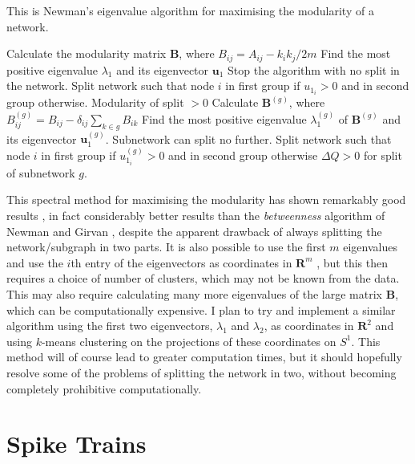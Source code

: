 \documentclass[a4paper,12pt]{report}
\begin{document}
\begin{algorithm}
\caption{This is Newman's eigenvalue algorithm for maximising the modularity of a network.}
\label{algo-split}
\begin{algorithmic}
\STATE Calculate the modularity matrix $\mathbf{B}$, where $B_{ij} = A_{ij} - k_ik_j/2m$
\STATE Find the most positive eigenvalue $\lambda_1$ and its eigenvector $\mathbf{u}_1$
\STATE Stop the algorithm with no split in the network.
\ELSE
\STATE Split network such that node $i$ in first group if $u_{1_{i}} > 0$ and in second group otherwise.
\ENSURE Modularity of split $> 0$
\ENDIF
{}
\STATE Calculate $\mathbf{B}^{(g)}$, where $B^{(g)}_{ij} = B_{ij} - \delta_{ij}\sum_{k\in g}B_{ik}$
\STATE Find the most positive eigenvalue $\lambda^{(g)}_1$ of $\mathbf{B}^{(g)}$ and its eigenvector $\mathbf{u}^{(g)}_1$.
\STATE Subnetwork can split no further.
\ELSE
\STATE Split network such that node $i$ in first group if $u^{(g)}_{1_{i}} > 0$ and in second group otherwise
\ENSURE $\Delta Q > 0$ for split of subnetwork $g$.
\ENDIF
\ENDFOR
\end{algorithmic}
\end{algorithm}



This spectral method for maximising the modularity has shown
remarkably good results \cite{Newman2006a}, in fact considerably better results
than the {\sl betweenness} algorithm of Newman and Girvan 
\cite{NewmanGirvan2004a}, despite the apparent drawback of always splitting the 
network/subgraph in two parts. It is also possible to use the first $m$ 
eigenvalues and use the $i$th entry of the eigenvectors as coordinates in 
$\mathbf{R}^{m}$ \cite{Humphries2011a}, but this then requires a choice of 
number of clusters, which may not be known from the data.  This may also 
require calculating many more eigenvalues of the large matrix $\mathbf{B}$, 
which can be computationally expensive.  I plan to try and implement a similar 
algorithm using the first two eigenvectors, $\lambda_1$ and $\lambda_2$, as 
coordinates in $\mathbf{R}^2$ and using $k$-means clustering on the projections 
of these coordinates on $S^1$.  This method will of course lead to greater 
computation times, but it should hopefully resolve some of the problems of 
splitting the network in two, without becoming completely prohibitive 
computationally.

\chapter{Spike Trains}
\end{document}
